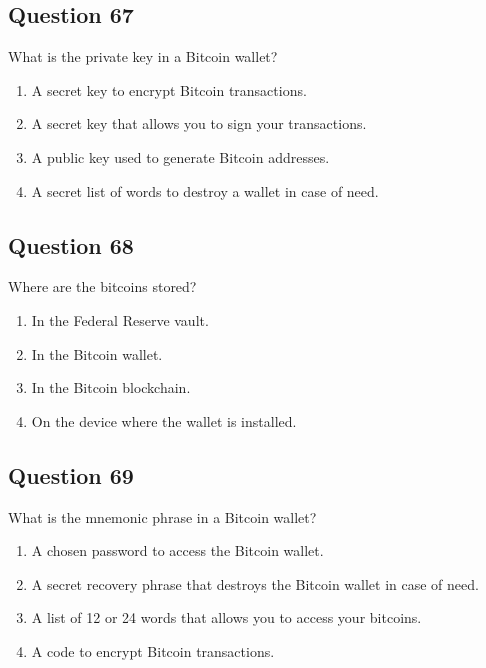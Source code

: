 \documentclass[12pt,a4paper]{article}
\begin{document}
\bigskip


\subsection*{Question 67}
What is the private key in a Bitcoin wallet?

\begin{enumerate}[label=\Alph*., leftmargin=*]
\item A secret key to encrypt Bitcoin transactions.
\item A secret key that allows you to sign your transactions.
\item A public key used to generate Bitcoin addresses.
\item A secret list of words to destroy a wallet in case of need.
\end{enumerate}

\bigskip


\subsection*{Question 68}
Where are the bitcoins stored?

\begin{enumerate}[label=\Alph*., leftmargin=*]
\item In the Federal Reserve vault.
\item In the Bitcoin wallet.
\item In the Bitcoin blockchain.
\item On the device where the wallet is installed.
\end{enumerate}

\bigskip


\subsection*{Question 69}
What is the mnemonic phrase in a Bitcoin wallet?

\begin{enumerate}[label=\Alph*., leftmargin=*]
\item A chosen password to access the Bitcoin wallet.
\item A secret recovery phrase that destroys the Bitcoin wallet in case of need.
\item A list of 12 or 24 words that allows you to access your bitcoins.
\item A code to encrypt Bitcoin transactions.
\end{enumerate}
\end{document}

